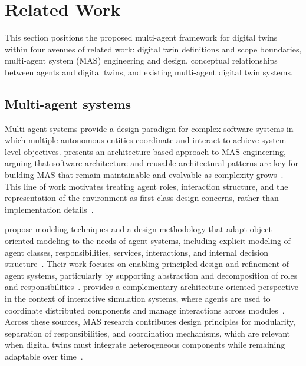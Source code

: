 \section{Related Work}
\label{sec:related_work}
This section positions the proposed multi-agent framework for digital twins within four avenues of related work: digital twin definitions and scope boundaries, multi-agent system (MAS) engineering and design, conceptual relationships between agents and digital twins, and existing multi-agent digital twin systems.



\subsection{Multi-agent systems}
Multi-agent systems provide a design paradigm for complex software systems in which multiple autonomous entities coordinate and interact to achieve system-level objectives. \citeauthor{weyns2010architecture} presents an architecture-based approach to MAS engineering, arguing that software architecture and reusable architectural patterns are key for building MAS that remain maintainable and evolvable as complexity grows~\cite{weyns2010architecture}.
This line of work motivates treating agent roles, interaction structure, and the representation of the environment as first-class design concerns, rather than implementation details~\cite{weyns2010architecture}.

\citeauthor{kinny1997_modelling_design_mas} propose modeling techniques and a design methodology that adapt object-oriented modeling to the needs of agent systems, including explicit modeling of agent classes, responsibilities, services, interactions, and internal decision structure~\cite{kinny1997_modelling_design_mas}.
Their work focuses on enabling principled design and refinement of agent systems, particularly by supporting abstraction and decomposition of roles and responsibilities~\cite{kinny1997_modelling_design_mas}.
\citeauthor{zhao2004agent} provides a complementary architecture-oriented perspective in the context of interactive simulation systems, where agents are used to coordinate distributed components and manage interactions across modules~\cite{zhao2004agent}.
Across these sources, MAS research contributes design principles for modularity, separation of responsibilities, and coordination mechanisms, which are relevant when digital twins must integrate heterogeneous components while remaining adaptable over time~\cite{weyns2010architecture,kinny1997_modelling_design_mas,zhao2004agent}.

